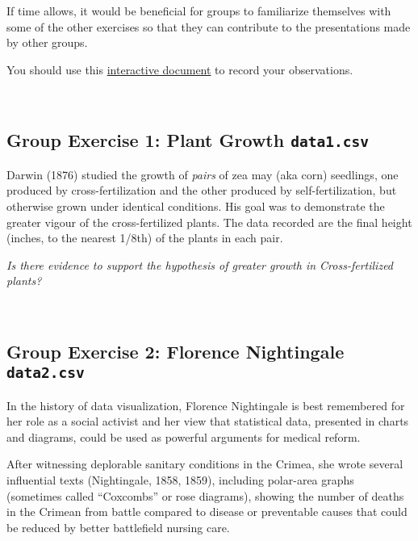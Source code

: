 \documentclass[]{article}
\begin{document}
If time allows, it would be beneficial for groups to familiarize
themselves with some of the other exercises so that they can contribute
to the presentations made by other groups.

You should use this
\href{https://public.etherpad-mozilla.org/p/2019-02-12-intro-to-stats}{interactive
document} to record your observations.

~

\hypertarget{group-exercise-1-plant-growth-data1.csv}{%
\subsection{\texorpdfstring{Group Exercise 1: Plant Growth
\texttt{data1.csv}}{Group Exercise 1: Plant Growth data1.csv}}\label{group-exercise-1-plant-growth-data1.csv}}

Darwin (1876) studied the growth of \emph{pairs} of zea may (aka corn)
seedlings, one produced by cross-fertilization and the other produced by
self-fertilization, but otherwise grown under identical conditions. His
goal was to demonstrate the greater vigour of the cross-fertilized
plants. The data recorded are the final height (inches, to the nearest
1/8th) of the plants in each pair.

{\emph{Is there evidence to support the hypothesis of greater growth in
Cross-fertilized plants?}}

~

\hypertarget{group-exercise-2-florence-nightingale-data2.csv}{%
\subsection{\texorpdfstring{Group Exercise 2: Florence Nightingale
\texttt{data2.csv}}{Group Exercise 2: Florence Nightingale data2.csv}}\label{group-exercise-2-florence-nightingale-data2.csv}}

In the history of data visualization, Florence Nightingale is best
remembered for her role as a social activist and her view that
statistical data, presented in charts and diagrams, could be used as
powerful arguments for medical reform.

After witnessing deplorable sanitary conditions in the Crimea, she wrote
several influential texts (Nightingale, 1858, 1859), including
polar-area graphs (sometimes called ``Coxcombs'' or rose diagrams),
showing the number of deaths in the Crimean from battle compared to
disease or preventable causes that could be reduced by better
battlefield nursing care.
\end{document}
